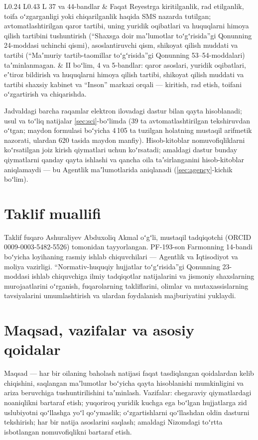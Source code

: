 \documentclass[14pt,a4paper]{extarticle}
\begin{document}
\begin{longtable}{L{0.24\linewidth} L{0.43\linewidth} L{\tabcolsep}}
37 va 44-bandlar & Faqat Reyestrga kiritilganlik, rad etilganlik, toifa oʻzgarganligi yoki chiqarilganlik haqida SMS nazarda tutilgan; avtomatlashtirilgan qaror tartibi, uning yuridik oqibatlari va huquqlarni himoya qilish tartibini tushuntirish (“Shaxsga doir maʼlumotlar toʻgʻrisida”gi Qonunning 24-moddasi uchinchi qismi), asoslantiruvchi qism, shikoyat qilish muddati va tartibi (“Maʼmuriy tartib-taomillar toʻgʻrisida”gi Qonunning 53–54-moddalari) taʼminlanmagan. & II boʻlim, 4 va 5-bandlar: qaror asoslari, yuridik oqibatlari, eʼtiroz bildirish va huquqlarni himoya qilish tartibi, shikoyat qilish muddati va tartibi shaxsiy kabinet va “Inson” markazi orqali — kiritish, rad etish, toifani oʻzgartirish va chiqarishda.\\
\bottomrule
\end{longtable}\endgroup

Jadvaldagi barcha raqamlar elektron ilovadagi dastur bilan qayta hisoblanadi; usul va toʻliq natijalar \ref{sec:sci}-boʻlimda (39 ta avtomatlashtirilgan tekshiruvdan oʻtgan; maydon formulasi boʻyicha 4\,105 ta tuzilgan holatning mustaqil arifmetik nazorati, ulardan 620 tasida maydon manfiy). Hisob-kitoblar nomuvofiqliklarni koʻrsatilgan joiz kirish qiymatlari uchun koʻrsatadi; amaldagi dastur bunday qiymatlarni qanday qayta ishlashi va qancha oila taʼsirlanganini hisob-kitoblar aniqlamaydi — bu Agentlik maʼlumotlarida aniqlanadi (\ref{sec:agency}-kichik boʻlim).

\section{Taklif muallifi}
Taklif fuqaro Ashuraliyev Abduxoliq Akmal oʻgʻli, mustaqil tadqiqotchi (ORCID 0009-0003-5482-5526) tomonidan tayyorlangan. PF-193-son Farmonning 14-bandi boʻyicha loyihaning rasmiy ishlab chiquvchilari — Agentlik va Iqtisodiyot va moliya vazirligi. “Normativ-huquqiy hujjatlar toʻgʻrisida”gi Qonunning 23-moddasi ishlab chiquvchiga ilmiy tadqiqotlar natijalarini va jismoniy shaxslarning murojaatlarini oʻrganish, fuqarolarning takliflarini, olimlar va mutaxassislarning tavsiyalarini umumlashtirish va ulardan foydalanish majburiyatini yuklaydi\cite{orq682}.

\section{Maqsad, vazifalar va asosiy qoidalar}
Maqsad — har bir oilaning baholash natijasi faqat tasdiqlangan qoidalardan kelib chiqishini, saqlangan maʼlumotlar boʻyicha qayta hisoblanishi mumkinligini va ariza beruvchiga tushuntirilishini taʼminlash. Vazifalar: chegaraviy qiymatlardagi noaniqlikni bartaraf etish; yuqoriroq yuridik kuchga ega boʻlgan hujjatlarga zid uslubiyotni qoʻllashga yoʻl qoʻymaslik; oʻzgartishlarni qoʻllashdan oldin dasturni tekshirish; har bir natija asoslarini saqlash; amaldagi Nizomdagi toʻrtta isbotlangan nomuvofiqlikni bartaraf etish.
\end{document}
